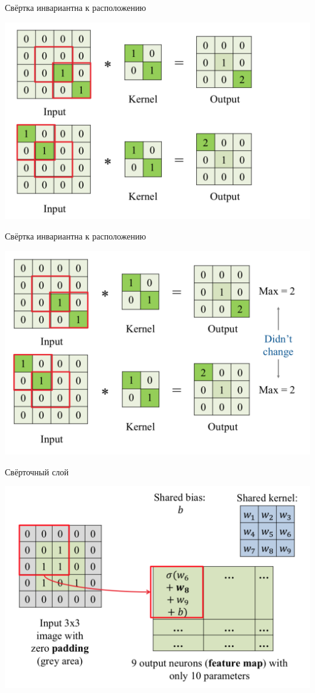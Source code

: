\documentclass[notes,12pt, aspectratio=169]{beamer}
\begin{document}
\begin{frame}{Свёртка инвариантна к расположению}
\begin{center}
	\includegraphics[width=.8\linewidth]{conv_3.png}
\end{center}
\end{frame}


\begin{frame}{Свёртка инвариантна к расположению}
\begin{center}
	\includegraphics[width=.8\linewidth]{conv_4.png}
\end{center}
\end{frame}





\begin{frame}{Свёрточный слой}
\begin{center}
	\includegraphics[width=.7\linewidth]{conv_layer.png}
\end{center}
\end{frame}
\end{document}
